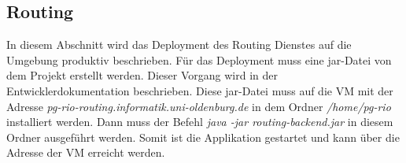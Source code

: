 \subsection{Routing}
In diesem Abschnitt wird das Deployment des Routing Dienstes auf die Umgebung produktiv beschrieben. 
Für das Deployment muss eine jar-Datei von dem Projekt erstellt werden. 
Dieser Vorgang wird in der Entwicklerdokumentation beschrieben. 
Diese jar-Datei muss auf die VM mit der Adresse \textit{pg-rio-routing.informatik.uni-oldenburg.de} in dem Ordner \textit{/home/pg-rio} installiert werden. 
Dann muss der Befehl \textit{java -jar routing-backend.jar} in diesem Ordner ausgeführt werden. 
Somit ist die Applikation gestartet und kann über die Adresse der VM erreicht werden.